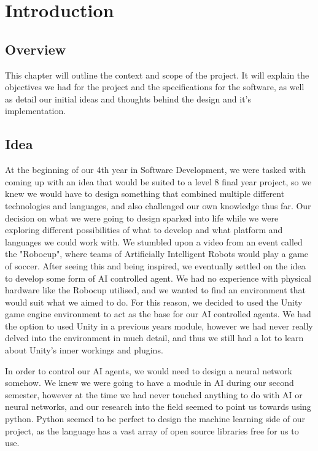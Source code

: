 
\chapter{Introduction}

\section{Overview}
This chapter will outline the context and scope of the project. It will explain the objectives we had for the project and the specifications for the software, as well as detail our initial ideas and thoughts behind the design and it's implementation. 

\section{Idea}
At the beginning of our 4th year in Software Development, we were tasked with coming up with an idea that would be suited to a level 8 final year project, so we knew we would have to design something that combined multiple different technologies and languages, and also challenged our own knowledge thus far. Our decision on what we were going to design sparked into life while we were exploring different possibilities of what to develop and what platform and languages we could work with. We stumbled upon a video from an event called the "Robocup", where teams of Artificially Intelligent Robots would play a game of soccer. After seeing this and being inspired, we eventually settled on the idea to develop some form of AI controlled agent. We had no experience with physical hardware like the Robocup utilised, and we wanted to find an environment that would suit what we aimed to do. For this reason, we decided to used the Unity game engine environment to act as the base for our AI controlled agents. We had the option to used Unity in a previous years module, however we had never really delved into the environment in much detail, and thus we still had a lot to learn about Unity's inner workings and plugins.

In order to control our AI agents, we would need to design a neural network somehow. We knew we were going to have a module in AI during our second semester, however at the time we had never touched anything to do with AI or neural networks, and our research into the field seemed to point us towards using python. Python seemed to be perfect to design the machine learning side of our project, as the language has a vast array of open source libraries free for us to use.

